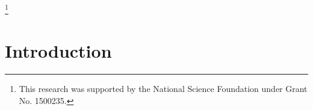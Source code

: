 \thanks{This research was supported by the National Science 
Foundation under Grant No. 1500235.
}

\date{10 Aug 2015 (draft 2)}







\begin{abstract}
This article explores various aspects of the problem of representing a finite lattice as the 
congruence lattice of a finite algebra or an interval in the subgroup lattice of a 
finite group. We describes various methods for representing a
finite lattice in these ways, or for proving
that such a representation exists.
Minimal representations are 
discussed including computer programs to find them. A catalog of representations 
of small lattices is given. It is shown that every lattice with at most seven elements, 
with only one possible exception, is isomorphic to
the congruence lattice of a finite algebra.
\end{abstract}


\maketitle


\section{Introduction}
\label{sec:intro}




